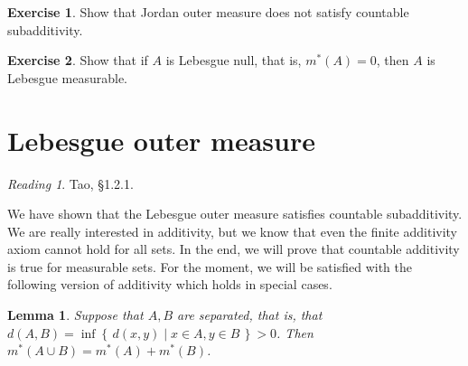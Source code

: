 \documentclass[11pt,oneside]{amsbook}
\newcommand{\set}[1]{\left\{\,#1\,\right\}}
\theoremstyle{definition}
\newtheorem{exerc}{Exercise}[section]
\theoremstyle{plain}
\newtheorem{lem}[thm]{Lemma}
\theoremstyle{definition}
\theoremstyle{remark}
\newtheorem*{reading}{Reading}
\numberwithin{equation}{section}
\numberwithin{figure}{section}
\begin{document}
\begin{exerc}
  Show that Jordan outer measure does not satisfy countable subadditivity.
\end{exerc}

\begin{exerc}
  Show that if $A$ is Lebesgue null, that is, $m^*(A)=0$, then $A$ is Lebesgue measurable.
\end{exerc}


\newpage
\section{Lebesgue outer measure}

\begin{reading}
  Tao, \S 1.2.1.
\end{reading}

We have shown that the Lebesgue outer measure satisfies countable subadditivity. We are really interested in additivity, but we know that even the finite additivity axiom cannot hold for all sets. In the end, we will prove that countable additivity is true for measurable sets. For the moment, we will be satisfied with the following version of additivity which holds in special cases.


\begin{lem}
  \label{lem:separated}
  Suppose that $A,B$ are separated, that is, that $d(A,B)=\inf\set{d(x,y)\mid x\in A, y\in B}>0$. Then $m^*(A\cup B)=m^*(A)+m^*(B)$.
\end{lem}
\end{document}
